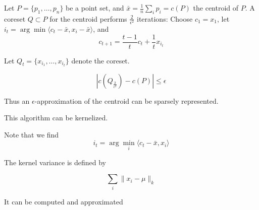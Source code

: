 \documentclass{article}
\def\inner#1#2{ \langle #1,#2 \rangle}
\begin{document}
Let $P=\{p_1,\ldots,p_n\}$ be a point set, and   $\bar{x}=\frac{1}{n}\sum_i p_i=c(P)$ the centroid of $P$.
A coreset $Q\subset P$ for the centroid performs $\frac{2}{\epsilon^2}$ iterations:
Choose $c_1=x_1$, 
let $i_t=\arg\min \inner{c_t-\bar{x}}{x_i-\bar{x}}$, and
$$
c_{t+1}=\frac{t-1}{t}c_t+\frac{1}{t}x_{i_t}
$$

Let $Q_t=\{x_{i_1},\ldots, x_{i_t}\}$ denote the coreset.

$$
|c(Q_{\frac{2}{\epsilon^2}})-c(P)|\leq\epsilon
$$

Thus an $\epsilon$-approximation of the centroid can be sparsely represented.

This algorithm can be kernelized.


Note that we find
$$
i_t=\arg\min_i \inner{c_t-\bar{x}}{x_i}
$$

The kernel variance is defined by

$$
\sum_i \|x_i-\mu\|_k
$$

It can be computed and approximated

\end{document}
